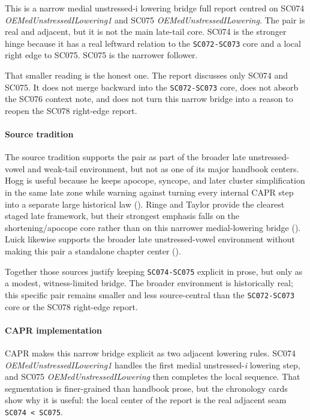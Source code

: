 \documentclass[
  british,
  a4paper,
]{article}
\begin{document}
This is a narrow medial unstressed-i lowering bridge full report centred
on SC074 \emph{OEMedUnstressedILowering1} and SC075
\emph{OEMedUnstressedILowering}. The pair is real and adjacent, but it
is not the main late-tail core. SC074 is the stronger hinge because it
has a real leftward relation to the \texttt{SC072-SC073} core and a
local right edge to SC075. SC075 is the narrower follower.

That smaller reading is the honest one. The report discusses only SC074
and SC075. It does not merge backward into the \texttt{SC072-SC073}
core, does not absorb the SC076 context note, and does not turn this
narrow bridge into a reason to reopen the SC078 right-edge report.

\paragraph{Source tradition}\label{source-tradition-46}

The source tradition supports the pair as part of the broader late
unstressed-vowel and weak-tail environment, but not as one of its major
handbook centers. Hogg is useful because he keeps apocope, syncope, and
later cluster simplification in the same late zone while warning against
turning every internal CAPR step into a separate large historical law
(). Ringe and Taylor provide
the clearest staged late framework, but their strongest emphasis falls
on the shortening/apocope core rather than on this narrower
medial-lowering bridge (). Luick likewise supports the
broader late unstressed-vowel environment without making this pair a
standalone chapter center ().

Together those sources justify keeping \texttt{SC074-SC075} explicit in
prose, but only as a modest, witness-limited bridge. The broader
environment is historically real; this specific pair remains smaller and
less source-central than the \texttt{SC072-SC073} core or the SC078
right-edge report.

\paragraph{CAPR implementation}\label{capr-implementation-46}

CAPR makes this narrow bridge explicit as two adjacent lowering rules.
SC074 \emph{OEMedUnstressedILowering1} handles the first medial
unstressed-\emph{i} lowering step, and SC075
\emph{OEMedUnstressedILowering} then completes the local sequence. That
segmentation is finer-grained than handbook prose, but the chronology
cards show why it is useful: the local center of the report is the real
adjacent seam \texttt{SC074\ \textless{}\ SC075}.
\end{document}

